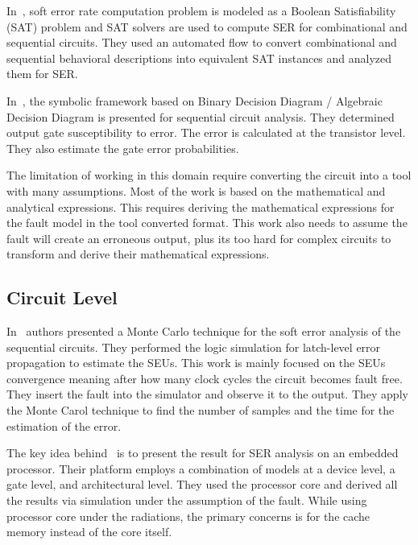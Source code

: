 In~\citep{shazli2011high}, soft error rate  computation problem is modeled as a Boolean
Satisfiability (SAT) problem and SAT solvers are used to compute SER for combinational and
sequential circuits. They used an automated flow to convert combinational and sequential behavioral
descriptions into equivalent SAT instances and analyzed them for SER.



In~\citep{miskov2007mars}, the symbolic framework based on Binary Decision Diagram / Algebraic Decision
Diagram is presented for sequential circuit analysis. They determined output gate susceptibility to error. The error is calculated at the transistor level. They also estimate the gate error probabilities.


The limitation of working in this domain require converting the circuit into a tool with many assumptions. Most of the work is based on the mathematical and analytical expressions. This requires deriving the mathematical expressions for the fault model in the tool converted format. This work also needs to assume the fault will create an erroneous output, plus its too hard for complex circuits to transform and derive their mathematical expressions.


\subsection{Circuit Level}


In~\citep{li2016monte} authors presented a  Monte Carlo technique for the soft error analysis of the sequential
circuits. They performed the logic simulation for latch-level error propagation to estimate the SEUs. This work is mainly focused on the SEUs convergence meaning after how many clock cycles the circuit becomes fault free.
They insert the fault into the simulator and observe it to the output. They apply the Monte Carol technique
to find the number of samples and the time for the estimation of the error.
  
  

The key idea behind~\citep{ebrahimi2015comprehensive} is to present the result for SER analysis on an embedded
processor. Their platform employs a combination of models at a device level, a gate level, and architectural level. They used the
processor core and derived all the results via simulation under the assumption of the fault. While using processor core under the radiations, the primary concerns is for the cache memory instead
of the core itself.


